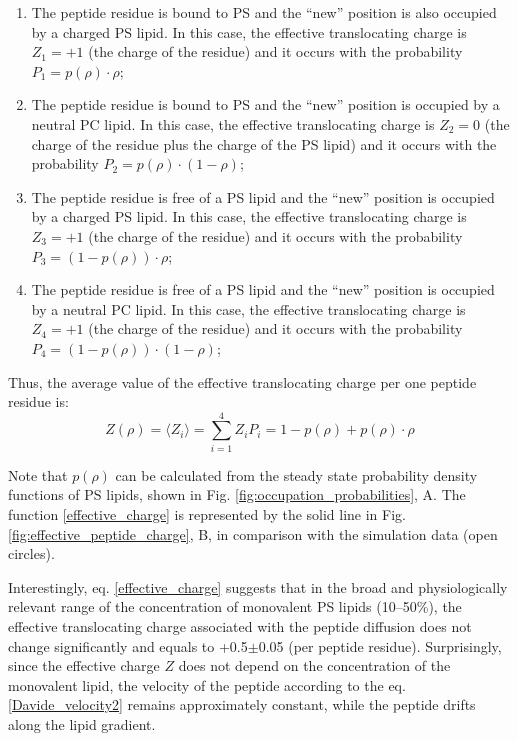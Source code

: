 \begin{enumerate}
 \item The peptide residue is bound to PS and the ``new'' position is also occupied by a charged PS lipid. In this case, the effective translocating charge is $Z_1=+1$ (the charge of the residue) and it occurs with the probability $P_1=p(\rho)\cdot\rho$;
 \item The peptide residue is bound to PS and the ``new'' position is occupied by a neutral PC lipid. In this case, the effective translocating charge is $Z_2=0$ (the charge of the residue plus the charge of the PS lipid) and it occurs with the probability $P_2=p(\rho)\cdot(1-\rho)$;
 \item The peptide residue is free of a PS lipid and the ``new'' position is occupied by a charged PS lipid. In this case, the effective translocating charge is $Z_3=+1$ (the charge of the residue) and it occurs with the probability $P_3=(1-p(\rho))\cdot\rho$;
 \item The peptide residue is free of a PS lipid and the ``new'' position is occupied by a neutral PC lipid. In this case, the effective translocating charge is $Z_4=+1$ (the charge of the residue) and it occurs with the probability $P_4=(1-p(\rho))\cdot(1-\rho)$;
\end{enumerate}

Thus, the average value of the effective translocating charge per one peptide residue is:
\begin{equation}
\label{effective_charge}
 Z(\rho) = \langle Z_i \rangle = \sum_{i=1}^4 Z_iP_i = 1-p(\rho) + p(\rho)\cdot \rho
\end{equation}

Note that $p(\rho)$ can be calculated from the steady state probability density functions of PS lipids, shown in Fig. \ref{fig:occupation_probabilities}, A. The function \eqref{effective_charge} is represented by the solid line in Fig. \ref{fig:effective_peptide_charge}, B, in comparison with the simulation data (open circles).

Interestingly, eq. \eqref{effective_charge} suggests that in the broad and physiologically relevant range of the concentration of monovalent PS lipids (10--50\%), the effective translocating charge associated with the peptide diffusion does not change significantly and equals to +0.5$\pm$0.05 (per peptide residue). Surprisingly, since the effective charge $Z$ does not depend on the concentration of the monovalent lipid, the velocity of the peptide according to the eq. \eqref{Davide_velocity2} remains approximately constant, while the peptide drifts along the lipid gradient.

